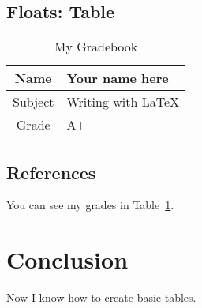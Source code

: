 \documentclass{article}
\begin{document}
\subsection{Floats: Table}
\begin{table}[htbp] %
\caption{My Gradebook}
\begin{center} %

	\begin{tabular}{|c|l|} %
	\hline
	Name & Your name here \\
	\hline
	Subject & Writing with \LaTeX \\
	\hline
	Grade & A+ \\
	\hline
	\end{tabular}

\end{center}
\label{tab:grades} %
\end{table}

\subsection{References}
You can see my grades in Table~\ref{tab:grades}.

\section{Conclusion}
Now I know how to create basic tables.
\end{document}
